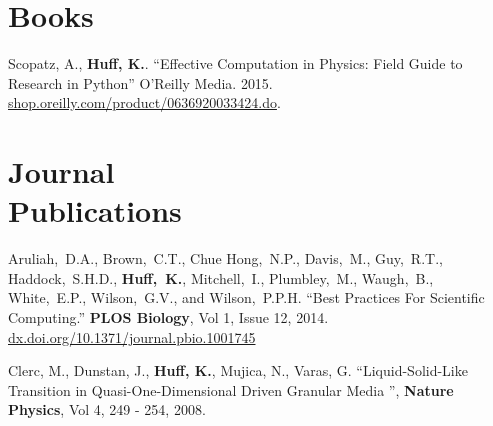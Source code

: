 \documentclass[margin,line]{resume}
\begin{document}
\begin{resume}
    \section{\mysidestyle Books}
      \begin{bibenum}
      \item Scopatz, A., \textbf{Huff, K.}. ``Effective Computation in
      Physics: Field Guide to Research in Python'' O'Reilly Media. 2015.
      \url{shop.oreilly.com/product/0636920033424.do}.
      \end{bibenum}
    \section{\mysidestyle Journal\\Publications}
      \begin{bibenum}
       \item Aruliah,~D.A., Brown,~C.T., Chue Hong,~N.P., Davis,~M., Guy,~R.T.,
          Haddock,~S.H.D., \textbf{Huff,~K.}, Mitchell,~I., Plumbley,~M., Waugh,~B.,
          White,~E.P., Wilson,~G.V., and Wilson,~P.P.H.  ``Best Practices For
          Scientific Computing.'' \textbf{PLOS Biology}, Vol 1, Issue 12,
          2014.\\\url{dx.doi.org/10.1371/journal.pbio.1001745}
       \item Clerc, M., Dunstan, J., \textbf{Huff, K.}, Mujica, N., Varas, G.
          ``Liquid-Solid-Like Transition in Quasi-One-Dimensional Driven
          Granular Media '',  \textbf{Nature Physics}, Vol 4, 249 - 254, 2008.
      \end{bibenum}

\end{resume}
\end{document}
